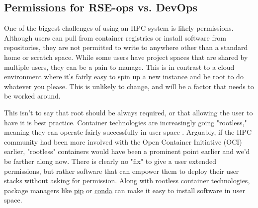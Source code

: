 \subsection{Permissions for RSE-ops vs. DevOps}

One of the biggest challenges of using an HPC system is likely permissions. Although users can pull from container registries or install software from repositories, they are not permitted to write to anywhere other than a standard home or scratch space. While some users have project spaces that are shared by multiple users, they can be a pain to manage. This is in contrast to a cloud environment where it's fairly easy to spin up a new instance and be root to do whatever you please. This is unlikely to change, and will be a factor that needs to be worked around.

This isn't to say that root should be always required, or that allowing the user to have it is best practice. Container technologies are increasingly going "rootless," meaning they can operate fairly successfully in user space \cite{charlie,podman,Priedhorsky2021-xx}. Arguably, if the HPC community had been more involved with the Open Container Initiative (OCI) earlier, "rootless" containers would have been a prominent point earlier and we'd be farther along now. There is clearly no "fix" to give a user extended permissions, but rather software that can empower them to deploy their user stacks without asking for permission. Along with rootless container technologies, package managers like \href{https://pypi.org/project/pip/}{pip} or \href{https://docs.conda.io/en/latest/}{conda} can make it easy to install software in user space. 
